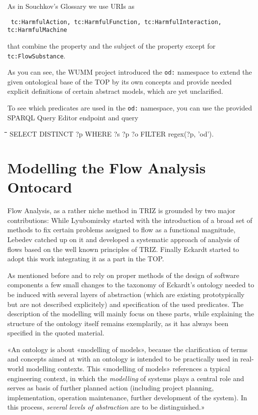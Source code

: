 \documentclass[a4paper,11pt]{article}
\newenvironment{code}{\tt \begin{tabbing}
\hskip12pt\=\hskip12pt\=\hskip12pt\=\hskip12pt\=\hskip5cm\=\hskip5cm\=\kill}
{\end{tabbing}}
\begin{document}
    As in Souchkov's Glossary we use URIs as 
    \begin{center}\tt
    tc:HarmfulAction, tc:HarmfulFunction, tc:HarmfulInteraction,
    tc:HarmfulMachine
    \end{center}
    that combine the property and the subject of the property except for
    \texttt{tc:FlowSubstance}.

    As you can see, the WUMM project introduced the \texttt{od:} namespace to
    extend the given ontological base of the TOP by its own concepts and 
    provide needed explicit definitions of certain abstract models, which
    are yet unclarified.

    To see which predicates are used in the \texttt{od:} namespace, you can
    use the provided SPARQL Query Editor endpoint \cite{SPARQL} and query

    \begin{code}
        SELECT DISTINCT ?p WHERE {?s ?p ?o FILTER regex(?p, 'od')}.
    \end{code}
    
    \section{Modelling the Flow Analysis Ontocard}
    Flow Analysis, as a rather niche method in TRIZ is grounded by two
    major contributions: While Lyubomirsky \cite{Lyubomirsky2006} started
    with the introduction of a broad set of methods to fix certain
    problems assigned to flow as a functional magnitude, Lebedev 
    \cite{Lebedev2011} \cite{Lebedyev2015} catched up on it and developed a 
    systematic approach of analysis of flows based on the well known principles
    of TRIZ. Finally Eckardt \cite{Eckardt2020} started to adopt this work
    integrating it as a part in the TOP.

    As mentioned before and to rely on proper methods of the design of 
    software components a few small changes to the taxonomy of Eckardt's 
    ontology needed to be induced with several layers of abstraction 
    (which are existing prototypically but are not described explicitely) and 
    specification of the used predicates. The description of the modelling 
    will mainly focus on these parts, while explaining the structure of the 
    ontology itself remains exemplarily, as it has always been specified in 
    the quoted material.

    «An ontology is about «modelling of models», because the clarification
    of terms and concepts aimed at with an ontology is intended to be
    practically used in real-world modelling contexts. This «modelling of 
    models» references a typical engineering context, in which the 
    \emph{modelling} of systems plays a central role and serves as basis of
    further planned action (including project planning, implementation,
    operation maintenance, further development of the system).
    In this process, \emph{several levels of abstraction} are to be 
    distinguished.»\cite{Graebe2021}
    
\end{document}
